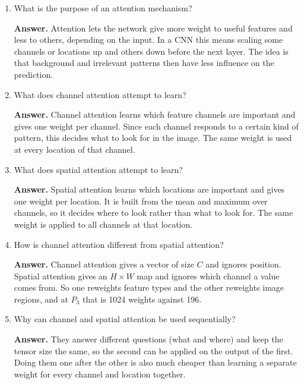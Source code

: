 \documentclass[10pt]{article}
\begin{document}
\begin{enumerate}
\textbf{Answer.} Low-level features are edges, colours and simple textures. Intermediate features are petals and repeated shapes. High-level features describe the whole flower and its class. In ResNet50 these roughly match conv2\_x, then conv3\_x and conv4\_x, and then conv5\_x, although the boundary between them is not sharp.

\item What is the purpose of an attention mechanism?

\textbf{Answer.} Attention lets the network give more weight to useful features and less to others, depending on the input. In a CNN this means scaling some channels or locations up and others down before the next layer. The idea is that background and irrelevant patterns then have less influence on the prediction.

\item What does channel attention attempt to learn?

\textbf{Answer.} Channel attention learns which feature channels are important and gives one weight per channel. Since each channel responds to a certain kind of pattern, this decides what to look for in the image. The same weight is used at every location of that channel.

\item What does spatial attention attempt to learn?

\textbf{Answer.} Spatial attention learns which locations are important and gives one weight per location. It is built from the mean and maximum over channels, so it decides where to look rather than what to look for. The same weight is applied to all channels at that location.

\item How is channel attention different from spatial attention?

\textbf{Answer.} Channel attention gives a vector of size $C$ and ignores position. Spatial attention gives an $H\times W$ map and ignores which channel a value comes from. So one reweights feature types and the other reweights image regions, and at $P_3$ that is 1024 weights against 196.

\item Why can channel and spatial attention be used sequentially?

\textbf{Answer.} They answer different questions (what and where) and keep the tensor size the same, so the second can be applied on the output of the first. Doing them one after the other is also much cheaper than learning a separate weight for every channel and location together.


\end{enumerate}
\end{document}
